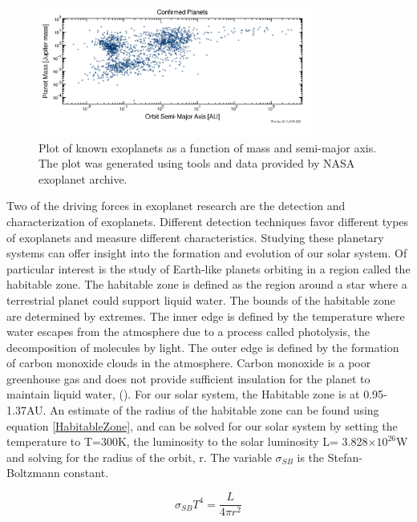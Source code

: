 \begin{figure}
    \centering
    \includegraphics[width=0.8\textwidth]{Chapter Materials/Introduction Materials/MassVsSemiAxis.png}
    \caption{Plot of known exoplanets as a function of mass and semi-major axis. The plot was generated using tools and data provided by NASA exoplanet archive.}
    \label{fig:exoplanets}
\end{figure}

Two of the driving forces in exoplanet research are the detection and characterization of exoplanets. Different detection techniques favor different types of exoplanets and measure different characteristics. Studying these planetary systems can offer insight into the formation and evolution of our solar system. Of particular interest is the study of Earth-like planets orbiting in a region called the habitable zone. The habitable zone is defined as the region around a star where a terrestrial planet could support liquid water. The bounds of the habitable zone are determined by extremes. The inner edge is defined by the temperature where water escapes from the atmosphere due to a process called photolysis, the decomposition of molecules by light. The outer edge is defined by the formation of carbon monoxide clouds in the atmosphere. Carbon monoxide is a poor greenhouse gas and does not provide sufficient insulation for the planet to maintain liquid water, (\cite{seager2010exoplanets}). For our solar system, the Habitable zone is at 0.95-1.37AU. An estimate of the radius of the habitable zone can be found using equation \ref{HabitableZone}, and can be solved for our solar system by setting the temperature to T=300K, the luminosity to the solar luminosity L= 3.828×$10^{26}$W and solving for the radius of the orbit, r. The variable $\sigma_{SB}$ is the Stefan-Boltzmann constant. 



\begin{equation}
    \sigma_{SB}T^4=\frac{L}{4\pi r^2} 
    \label{HabitableZone}
\end{equation}



